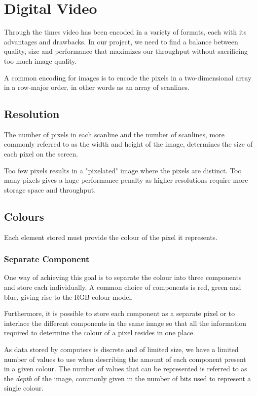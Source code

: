 \section{Digital Video}
Through the times video has been encoded in a variety of formats, each with its advantages and drawbacks.
In our project, we need to find a balance between quality, size and performance that maximizes our throughput without sacrificing too much image quality.

A common encoding for images is to encode the pixels in a two-dimensional array in a row-major order, in other words as an array of scanlines.

\subsection{Resolution}
The number of pixels in each scanline and the number of scanlines, more commonly referred to as the width and height of the image, determines the size of each pixel on the screen.

Too few pixels results in a "pixelated" image where the pixels are distinct.
Too many pixels gives a huge performance penalty as higher resolutions require more storage space and throughput.

\subsection{Colours}
Each element stored must provide the colour of the pixel it represents.

\subsubsection{Separate Component}
One way of achieving this goal is to separate the colour into three components and store each individually.
A common choice of components is red, green and blue, giving rise to the RGB colour model.

Furthermore, it is possible to store each component as a separate pixel or to interlace the different components in the same image so that all the information required to determine the colour of a pixel resides in one place.

As data stored by computers is discrete and of limited size, we have a limited number of values to use when describing the amount of each component present in a given colour.
The number of values that can be represented is referred to as the \textit{depth} of the image, commonly given in the number of bits used to represent a single colour.

